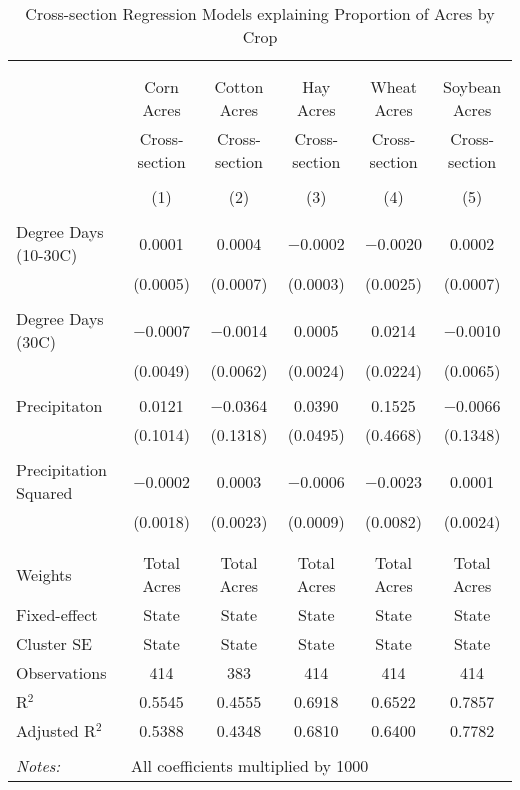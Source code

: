 \documentclass[10pt]{article}
\begin{document}
\begin{table}[!htbp] \centering 
  \caption{Cross-section Regression Models explaining Proportion of Acres by Crop} 
  \label{} 
\footnotesize 
\begin{tabular}{@{\extracolsep{5pt}}lccccc} 
\\[-1.8ex]\hline 
\hline \\[-1.8ex] 
\\[-1.8ex] & Corn Acres & Cotton Acres & Hay Acres & Wheat Acres & Soybean Acres \\ 
 & Cross-section & Cross-section & Cross-section & Cross-section & Cross-section \\ 
\\[-1.8ex] & (1) & (2) & (3) & (4) & (5)\\ 
\hline \\[-1.8ex] 
 Degree Days (10-30C) & 0.0001 & 0.0004 & $-$0.0002 & $-$0.0020 & 0.0002 \\ 
  & (0.0005) & (0.0007) & (0.0003) & (0.0025) & (0.0007) \\ 
  & & & & & \\ 
 Degree Days (30C) & $-$0.0007 & $-$0.0014 & 0.0005 & 0.0214 & $-$0.0010 \\ 
  & (0.0049) & (0.0062) & (0.0024) & (0.0224) & (0.0065) \\ 
  & & & & & \\ 
 Precipitaton & 0.0121 & $-$0.0364 & 0.0390 & 0.1525 & $-$0.0066 \\ 
  & (0.1014) & (0.1318) & (0.0495) & (0.4668) & (0.1348) \\ 
  & & & & & \\ 
 Precipitation Squared & $-$0.0002 & 0.0003 & $-$0.0006 & $-$0.0023 & 0.0001 \\ 
  & (0.0018) & (0.0023) & (0.0009) & (0.0082) & (0.0024) \\ 
  & & & & & \\ 
\hline \\[-1.8ex] 
Weights & Total Acres & Total Acres & Total Acres & Total Acres & Total Acres \\ 
Fixed-effect & State & State & State & State & State \\ 
Cluster SE & State & State & State & State & State \\ 
Observations & 414 & 383 & 414 & 414 & 414 \\ 
R$^{2}$ & 0.5545 & 0.4555 & 0.6918 & 0.6522 & 0.7857 \\ 
Adjusted R$^{2}$ & 0.5388 & 0.4348 & 0.6810 & 0.6400 & 0.7782 \\ 
\hline 
\hline \\[-1.8ex] 
\textit{Notes:} & \multicolumn{5}{l}{All coefficients multiplied by 1000} \\ 
\end{tabular} 
\end{table} 
\end{document}
